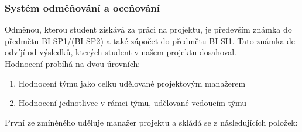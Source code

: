 \subsubsection{Systém odměňování a oceňování} \label{ppl:ranking}
Odměnou, kterou student získává za práci na projektu, je především známka do předmětu BI-SP1/(BI-SP2) a také zápočet do předmětu BI-SI1. Tato známka de odvíjí od výsledků, kterých student v našem projektu dosahoval.\\
Hodnocení probíhá na dvou úrovních:
\begin{enumerate}
	\item Hodnocení týmu jako celku udělované projektovým manažerem
	\item Hodnocení jednotlivce v rámci týmu, udělované vedoucím týmu
\end{enumerate}
První ze zmíněného uděluje manažer projektu a skládá se z následujících položek:
